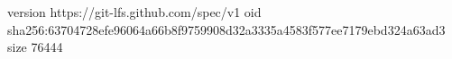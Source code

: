 version https://git-lfs.github.com/spec/v1
oid sha256:63704728efe96064a66b8f9759908d32a3335a4583f577ee7179ebd324a63ad3
size 76444
